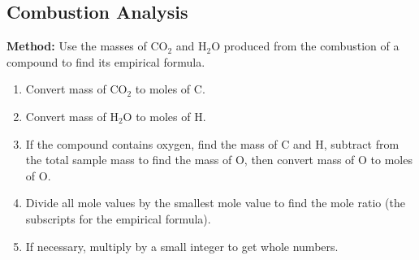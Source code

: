 \documentclass{article}
\begin{document}
\subsection*{Combustion Analysis}
\textbf{Method:} Use the masses of CO\(_2\) and H\(_2\)O produced from the combustion of a compound to find its empirical formula.
\begin{enumerate}[itemsep=3pt]
    \item Convert mass of CO\(_2\) to moles of C.
    \item Convert mass of H\(_2\)O to moles of H.
    \item If the compound contains oxygen, find the mass of C and H, subtract from the total sample mass to find the mass of O, then convert mass of O to moles of O.
    \item Divide all mole values by the smallest mole value to find the mole ratio (the subscripts for the empirical formula).
    \item If necessary, multiply by a small integer to get whole numbers.
\end{enumerate}
\end{document}
